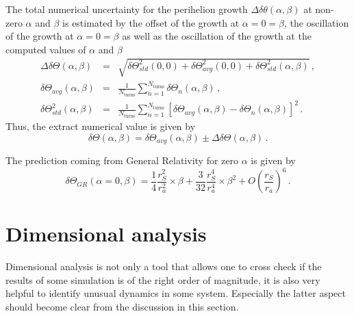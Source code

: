 \documentclass[12pt,ngerman,american]{iopart}
\begin{document}
The total numerical uncertainty for the perihelion growth $\Delta \delta \theta (\alpha, \beta)$ at non-zero $\alpha$ and $\beta$ is estimated by the offset of the growth at $\alpha = 0 = \beta$, the oscillation of the growth at $\alpha = 0 = \beta$ as well as the oscillation of the growth at the computed values of $\alpha$ and $\beta$
\begin{eqnarray}\label{eq:num-uncertainty}
	\Delta \delta \Theta (\alpha, \beta) &=& \sqrt{
		\delta \Theta_{std}^2 (0, 0) + \delta \Theta_{avg}^2 (0, 0)+ \delta \Theta_{std}^2 (\alpha, \beta)
	} \, ,
	\\
	\delta \Theta_{avg} (\alpha, \beta)
	&=& 
	\frac{1}{N_{\mathrm{turns}}}
	\sum\limits_{n=1}^{N_{\mathrm{turns}}} \delta \Theta_{n} (\alpha, \beta) \, ,
	\\
	\delta \Theta_{std}^2 (\alpha, \beta)
	&=& 
	\frac{1}{N_{\mathrm{turns}}}
	\sum\limits_{n=1}^{N_{\mathrm{turns}}} \left[
		\delta \Theta_{avg} (\alpha, \beta) - \delta \Theta_{n} (\alpha, \beta)
	\right]^2 \, .
\end{eqnarray}
Thus, the extract numerical value is given by
\begin{equation}
	\delta \Theta (\alpha, \beta) = \delta \Theta_{avg} (\alpha, \beta)  \pm \Delta \delta \Theta (\alpha, \beta)
	\, .
\end{equation}

The prediction coming from General Relativity for zero $\alpha$ is given by
\begin{equation}
	\delta \Theta_{GR} (\alpha=0, \beta) = 
	\frac{1}{4} \frac{r_S^2}{r_a^2} \times \beta
	+\frac{3}{32} \frac{ r_S^4}{ r_a^4} \times \beta ^2
	+O\left(\frac{r_S}{r_a}\right)^6
	\, .
\end{equation}


\section{Dimensional analysis}\label{sec:analysis}

Dimensional analysis is not only a tool that allows one to cross check if the results of some simulation is of the right order of magnitude, it is also very helpful to identify unusual dynamics in some system.
Especially the latter aspect should become clear from the discussion in this section.
\end{document}
